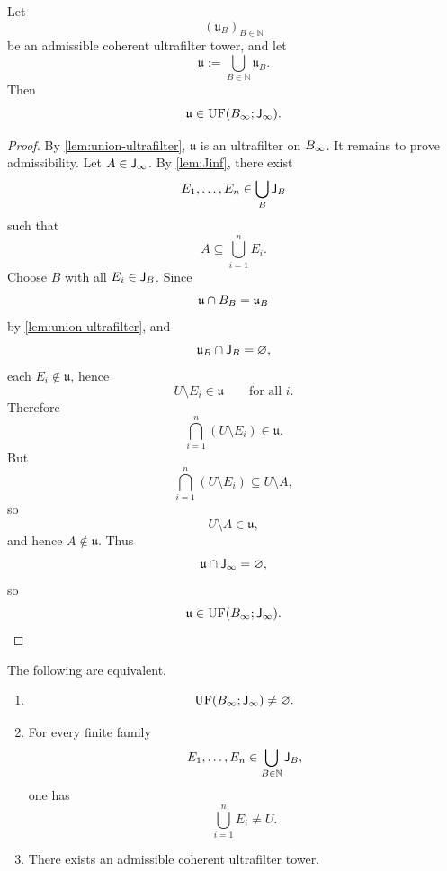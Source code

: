 \begin{lemma}
	\label{lem:admiss-limit}
	Let
	\[
		(\mathfrak u_B)_{B\in\mathbb N}
	\]
	be an admissible coherent ultrafilter tower, and let
	\[
		\mathfrak u:=\bigcup_{B\in\mathbb N}\mathfrak u_B.
	\]
	Then
	\[
		\mathfrak u\in\operatorname{UF}(B_\infty;\mathsf J_\infty).
	\]
\end{lemma}
\begin{proof}
	By \cref{lem:union-ultrafilter}, \(\mathfrak u\) is an ultrafilter on
	\(B_\infty\). It remains to prove admissibility.
	Let \(A\in\mathsf J_\infty\). By \cref{lem:Jinf}, there exist
	\[
		E_1,\dots,E_n\in\bigcup_B\mathsf J_B
	\]
	such that
	\[
		A\subseteq\bigcup_{i=1}^n E_i.
	\]
	Choose \(B\) with all \(E_i\in\mathsf J_B\). Since
	\[
		\mathfrak u\cap B_B=\mathfrak u_B
	\]
	by \cref{lem:union-ultrafilter}, and
	\[
		\mathfrak u_B\cap\mathsf J_B=\varnothing,
	\]
	each \(E_i\notin\mathfrak u\), hence
	\[
		U\setminus E_i\in\mathfrak u
		\qquad
		\text{for all }i.
	\]
	Therefore
	\[
		\bigcap_{i=1}^n(U\setminus E_i)\in\mathfrak u.
	\]
	But
	\[
		\bigcap_{i=1}^n(U\setminus E_i)\subseteq U\setminus A,
	\]
	so
	\[
		U\setminus A\in\mathfrak u,
	\]
	and hence \(A\notin\mathfrak u\). Thus
	\[
		\mathfrak u\cap\mathsf J_\infty=\varnothing,
	\]
	so
	\[
		\mathfrak u\in\operatorname{UF}(B_\infty;\mathsf J_\infty).
	\]
\end{proof}
\begin{theorem}
	\label{thm:boundary}
	The following are equivalent.
	\begin{enumerate}[label=\textup{(\arabic*)}]
		\item
		      \[
			      \operatorname{UF}(B_\infty;\mathsf J_\infty)\neq\varnothing.
		      \]
		\item For every finite family
		      \[
			      E_1,\dots,E_n\in\bigcup_{B\in\mathbb N}\mathsf J_B,
		      \]
		      one has
		      \[
			      \bigcup_{i=1}^n E_i\neq U.
		      \]
		\item There exists an admissible coherent ultrafilter tower.
	\end{enumerate}
\end{theorem}
